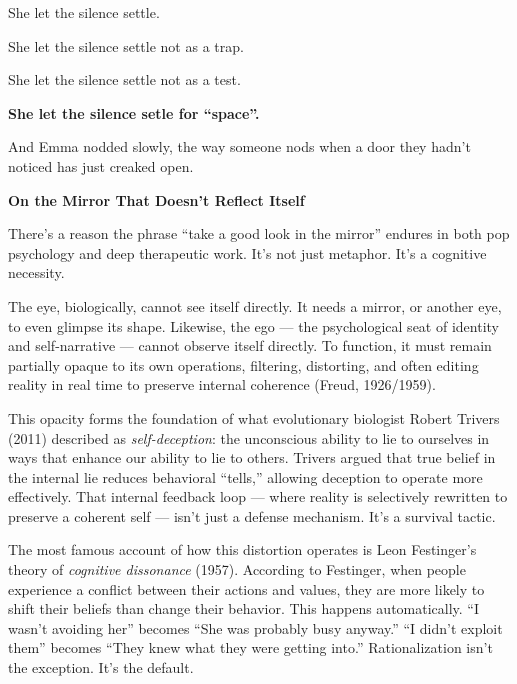 She let the silence settle. 

She let the silence settle not as a trap.  

She let the silence settle not as a test. 

\textbf{She let the silence setle for ``space''.} 

And Emma nodded slowly, the way someone nods when a door they hadn’t noticed has just creaked open.

\medskip

\begin{PsychologicalSidebar}{\textbf{On the Mirror That Doesn’t Reflect Itself}}

  There’s a reason the phrase ``take a good look in the mirror'' endures in both pop psychology 
  and deep therapeutic work. It’s not just metaphor. It’s a cognitive necessity.
  
  \medskip
  
  The eye, biologically, cannot see itself directly. It needs a mirror, or another eye, to even 
  glimpse its shape. Likewise, the ego --- the psychological seat of identity and self-narrative --- 
  cannot observe itself directly. To function, it must remain partially opaque to its own 
  operations, filtering, distorting, and often editing reality in real time to preserve internal 
  coherence (Freud, 1926/1959).
  
  \medskip
  
  This opacity forms the foundation of what evolutionary biologist Robert Trivers (2011) 
  described as \textit{self-deception}: the unconscious ability to lie to ourselves in ways that 
  enhance our ability to lie to others. Trivers argued that true belief in the internal lie 
  reduces behavioral ``tells,'' allowing deception to operate more effectively. That internal 
  feedback loop --- where reality is selectively rewritten to preserve a coherent self --- 
  isn’t just a defense mechanism. It’s a survival tactic.
  
  \medskip
  
  The most famous account of how this distortion operates is Leon Festinger’s theory of 
  \textit{cognitive dissonance} (1957). According to Festinger, when people experience a conflict 
  between their actions and values, they are more likely to shift their beliefs than change their 
  behavior. This happens automatically. ``I wasn’t avoiding her'' becomes ``She was probably busy 
  anyway.'' ``I didn’t exploit them'' becomes ``They knew what they were getting into.'' 
  Rationalization isn’t the exception. It’s the default.
  

\end{PsychologicalSidebar}
